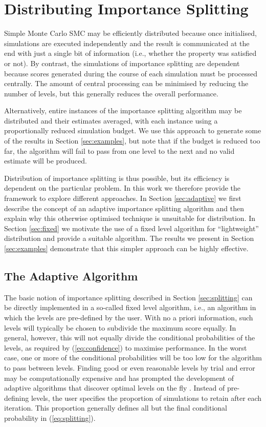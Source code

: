 \documentclass{llncs}
\begin{document}
\section{Distributing Importance Splitting}

Simple Monte Carlo SMC may be efficiently distributed because once
initialised, simulations are executed independently and the result
is communicated at the end with just a single bit of information (i.e.,
whether the property was satisfied or not). By contrast, the simulations
of importance splitting are dependent because scores generated during
the course of each simulation must be processed centrally. The amount
of central processing can be minimised by reducing the number of levels,
but this generally reduces the overall performance.

Alternatively, entire instances of the importance splitting algorithm
may be distributed and their estimates averaged, with each instance
using a proportionally reduced simulation budget. We use this approach
to generate some of the results in Section \ref{sec:examples}, but
note that if the budget is reduced too far, the algorithm will fail
to pass from one level to the next and no valid estimate will be produced. 

Distribution of importance splitting is thus possible, but its efficiency
is dependent on the particular problem. In this work we therefore
provide the framework to explore different approaches. In Section
\ref{sec:adaptive} we first describe the concept of an adaptive importance
splitting algorithm and then explain why this otherwise optimised
technique is unsuitable for distribution. In Section \ref{sec:fixed}
we motivate the use of a fixed level algorithm for ``lightweight''
distribution and provide a suitable algorithm. The results we present
in Section \ref{sec:examples} demonstrate that this simpler approach
can be highly effective.


\subsection{The Adaptive Algorithm\label{sec:adaptive}}

The basic notion of importance splitting described in Section \ref{sec:splitting}
can be directly implemented in a so-called fixed level algorithm,
i.e., an algorithm in which the levels are pre-defined by the user.
With no a priori information, such levels will typically be chosen
to subdivide the maximum score equally. In general, however, this
will not equally divide the conditional probabilities of the levels,
as required by (\ref{eq:confidence}) to maximise performance. In
the worst case, one or more of the conditional probabilities will
be too low for the algorithm to pass between levels. Finding good
or even reasonable levels by trial and error may be computationally
expensive and has prompted the development of adaptive algorithms
that discover optimal levels on the fly \cite{CerouGuyader2007,JegourelLegaySedwards2013,JegourelLegaySedwards2014}.
Instead of pre-defining levels, the user specifies the proportion
of simulations to retain after each iteration. This proportion generally
defines all but the final conditional probability in (\ref{eq:splitting}).
\end{document}
